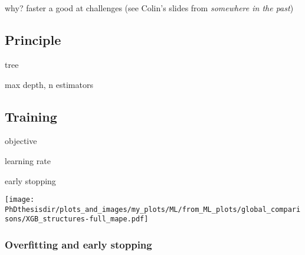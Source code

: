 \section{\XGBOOST}\label{chapter-ML-section-XGB}
why? faster a good at challenges (see Colin's slides from \emph{somewhere in the past})
\subsection{Principle}
tree

max depth, n estimators

\subsection{Training}

objective

learning rate

early stopping

\texttt{[image: \\PhDthesisdir/plots\_and\_images/my\_plots/ML/from\_ML\_plots/global\_comparisons/XGB\_structures-full\_mape.pdf]}



\subsubsection{Overfitting and early stopping}





